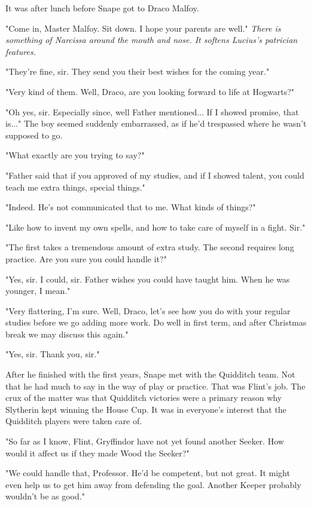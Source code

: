 \documentclass[a4paper,11pt]{article}
\begin{document}
It was after lunch before Snape got to Draco Malfoy.

"Come in, Master Malfoy. Sit down. I hope your parents are well." \emph{There is something of Narcissa around the mouth and nose. It softens Lucius's patrician features.}

"They're fine, sir. They send you their best wishes for the coming year."

"Very kind of them. Well, Draco, are you looking forward to life at Hogwarts?"

"Oh yes, sir. Especially since, well Father mentioned... If I showed promise, that is..." The boy seemed suddenly embarrassed, as if he'd trespassed where he wasn't supposed to go.

"What exactly are you trying to say?"

"Father said that if you approved of my studies, and if I showed talent, you could teach me extra things, special things."

"Indeed. He's not communicated that to me. What kinds of things?"

"Like how to invent my own spells, and how to take care of myself in a fight. Sir."

"The first takes a tremendous amount of extra study. The second requires long practice. Are you sure you could handle it?"

"Yes, sir. I could, sir. Father wishes you could have taught him. When he was younger, I mean."

"Very flattering, I'm sure. Well, Draco, let's see how you do with your regular studies before we go adding more work. Do well in first term, and after Christmas break we may discuss this again."

"Yes, sir. Thank you, sir."

After he finished with the first years, Snape met with the Quidditch team. Not that he had much to say in the way of play or practice. That was Flint's job. The crux of the matter was that Quidditch victories were a primary reason why Slytherin kept winning the House Cup. It was in everyone's interest that the Quidditch players were taken care of.

"So far as I know, Flint, Gryffindor have not yet found another Seeker. How would it affect us if they made Wood the Seeker?"

"We could handle that, Professor. He'd be competent, but not great. It might even help us to get him away from defending the goal. Another Keeper probably wouldn't be as good."
\end{document}
